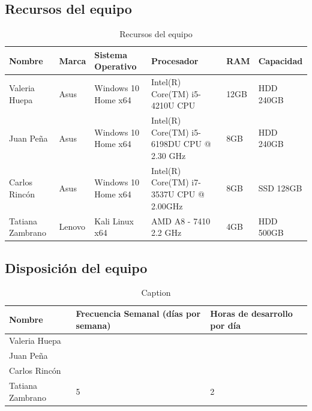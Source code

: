 \documentclass[a4paper,12 pt]{article}
\begin{document}
\subsection{Recursos del equipo}

\begin{table}[H]
    \centering
    \small{
    \begin{tabular}{|M{2cm}|M{1.5cm}|M{3cm}|M{3cm}|M{1.5cm}|M{2cm}|}
        \hline
        \textbf{Nombre}    &\textbf{Marca}     &\textbf{Sistema Operativo} 
        &\textbf{Procesador}   &\textbf{RAM}   &\textbf{Capacidad}\\
        \hline
        Valeria Huepa                       &Asus   &Windows 10 Home x64 
        & Intel(R) Core(TM) i5-4210U CPU    &12GB   &HDD 240GB \\
        \hline
        Juan Peña                           &Asus   &Windows 10 Home x64
        &Intel(R) Core(TM) i5-6198DU CPU @ 2.30 GHz &8GB    &HDD 240GB\\
        \hline
        Carlos Rincón                       &Asus   &Windows 10 Home x64
        &Intel(R) Core(TM) i7-3537U CPU @ 2.00GHz   &8GB    &SSD 128GB\\
        \hline
        Tatiana Zambrano                    &Lenovo &Kali Linux x64
        &AMD A8 - 7410 2.2 GHz              &4GB    &HDD 500GB\\
        \hline
    \end{tabular}
    \caption{Recursos del equipo}
    \label{T01}}
\end{table}{}

\subsection{Disposición del equipo}

\begin{table}[H]
    \centering
    \small{
    \begin{tabular}{|M{2cm}|M{4cm}|M{4cm}|}
        \hline
        \textbf{Nombre}    & \textbf{Frecuencia Semanal (días por semana)}   
        &\textbf{Horas de desarrollo por día}\\
        \hline
        Valeria Huepa   &       &       \\
        \hline
        Juan Peña       &       &       \\
        \hline
        Carlos Rincón   &       &       \\
        \hline
        Tatiana Zambrano    & 5      &  2     \\
        \hline
    \end{tabular}
    \caption{Caption}
    \label{tab:my_label}}
\end{table}{}
\end{document}
